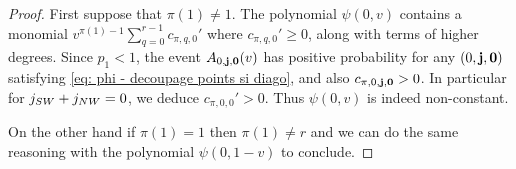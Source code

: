 \documentclass[10pt,a4paper]{amsart}
\begin{document}
\begin{proof}
    First suppose that $\pi(1)\ne1$.
    The polynomial $\psi(0,v)$ contains a monomial $v^{\pi(1)-1} \sum_{q=0}^{r-1} c_{\pi,q,0}'$ where $c_{\pi,q,0}'\ge0$, along with terms of higher degrees.
    Since $p_1<1$, the event $A_{0,\bf j,0}(v)$ has positive probability for any $(0,\bf j,0)$ satisfying \eqref{eq: phi - decoupage points si diago}, and also $c_{\pi,0,\bf j,0} >0$.
    In particular for $j_{\rm SW}+j_{\rm NW} = 0$, we deduce $c_{\pi,0,0}'>0$.
    Thus $\psi(0,v)$ is indeed non-constant. 
    
    On the other hand if $\pi(1)=1$ then $\pi(1)\ne r$ and we can do the same reasoning with the polynomial $\psi(0,1-v)$ to conclude.
\end{proof}
\end{document}
